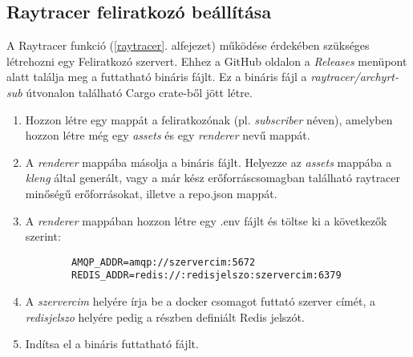 \subsection{Raytracer feliratkozó beállítása}\label{subscriber}


A Raytracer funkció (\ref{raytracer}. alfejezet) működése érdekében szükséges létrehozni egy Feliratkozó szervert.
Ehhez a GitHub oldalon a \emph{Releases} menüpont alatt találja meg a futtatható bináris fájlt.
Ez a bináris fájl a \emph{raytracer/archyrt-sub} útvonalon található Cargo crate-ből jött létre.


\begin{enumerate}
    \item Hozzon létre egy mappát a feliratkozónak (pl. \emph{subscriber} néven), amelyben hozzon létre még egy \emph{assets} és egy \emph{renderer} nevű mappát.

    \item A \emph{renderer} mappába másolja a bináris fájlt. Helyezze az \emph{assets} mappába a \emph{kleng} által generált, vagy a már kész erőforráscsomagban található raytracer minőségű erőforrásokat, illetve a repo.json mappát.

    \item A \emph{renderer} mappában hozzon létre egy .env fájlt és töltse ki a következők szerint:
          \begin{lstlisting}
        AMQP_ADDR=amqp://szervercim:5672
        REDIS_ADDR=redis://:redisjelszo:szervercim:6379\end{lstlisting}

    \item A \emph{szervercim} helyére írja be a docker csomagot futtató szerver címét, a \emph{redisjelszo} helyére pedig a \textbf{} részben definiált Redis jelszót.

    \item Indítsa el a bináris futtatható fájlt.
\end{enumerate}